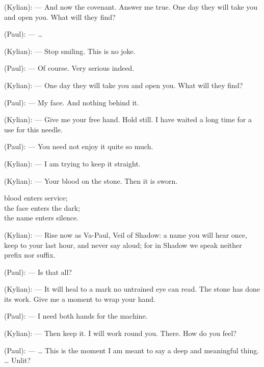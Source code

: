 \begin{room}
(Kylian): --- And now the covenant. Answer me true. One day they will take you and open you. What will they find?

(Paul): --- \ldots{}

(Kylian): --- Stop smiling. This is no joke.

(Paul): --- Of course. Very serious indeed.

(Kylian): --- One day they will take you and open you. What will they find?

(Paul): --- My face. And nothing behind it.

(Kylian): --- Give me your free hand. Hold still. I have waited a long time for a use for this needle.

(Paul): --- You need not enjoy it quite so much.

(Kylian): --- I am trying to keep it straight.

\centerline{}

(Kylian): --- Your blood on the stone. Then it is sworn.

\begin{scripture}
blood enters service; \\
the face enters the dark; \\
the name enters silence.
\end{scripture}

(Kylian): --- Rise now as Va-Paul, Veil of Shadow: a name you will hear once, keep to your last hour, and never say aloud; for in Shadow we speak neither prefix nor suffix.

\centerline{}

(Paul): --- Is that all?

(Kylian): --- It will heal to a mark no untrained eye can read. The stone has done its work. Give me a moment to wrap your hand.

(Paul): --- I need both hands for the machine.

(Kylian): --- Then keep it. I will work round you. There. How do you feel?

(Paul): --- \ldots{} This is the moment I am meant to say a deep and meaningful thing. \ldots{} Unlit?

\end{room}
